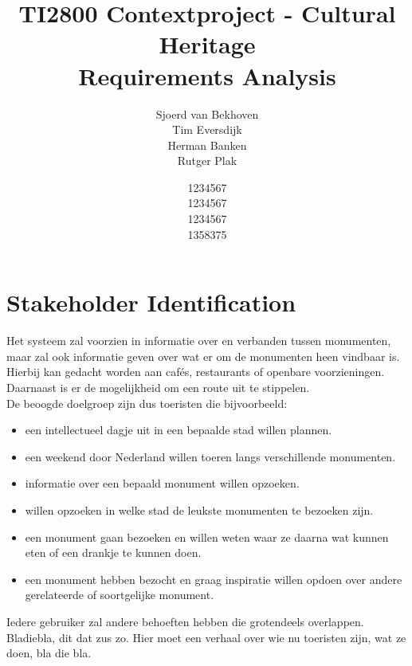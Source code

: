 \documentclass{article}
\begin{document}
\title{TI2800 Contextproject - Cultural Heritage \\ Requirements Analysis}
\author{Sjoerd van Bekhoven \\ Tim Eversdijk \\ Herman Banken \\ Rutger Plak \and 1234567 \\ 1234567 \\ 1234567 \\ 1358375}
\maketitle

\section{Stakeholder Identification}
Het systeem zal voorzien in informatie over en verbanden tussen monumenten, maar zal ook informatie geven over wat er om de monumenten heen vindbaar is. Hierbij kan gedacht worden aan caf\'es, restaurants of openbare voorzieningen. Daarnaast is er de mogelijkheid om een route uit te stippelen.\\
De beoogde doelgroep zijn dus toeristen die bijvoorbeeld:
\begin{itemize}
		\item{een intellectueel dagje uit in een bepaalde stad willen plannen.}
		\item{een weekend door Nederland willen toeren langs verschillende monumenten.}
		\item{informatie over een bepaald monument willen opzoeken.}
		\item{willen opzoeken in welke stad de leukste monumenten te bezoeken zijn.}
		\item{een monument gaan bezoeken en willen weten waar ze daarna wat kunnen eten of een drankje te kunnen doen.}
		\item{een monument hebben bezocht en graag inspiratie willen opdoen over andere gerelateerde of soortgelijke monument.}
\end{itemize}
Iedere gebruiker zal andere behoeften hebben die grotendeels overlappen. Bladiebla, dit dat zus zo. Hier moet een verhaal over wie nu toeristen zijn, wat ze doen, bla die bla.
\end{document}
